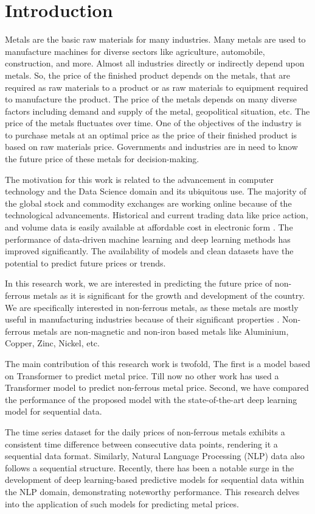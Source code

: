 \documentclass{ws-ijait}
\begin{document}
\section{Introduction}
Metals are the basic raw materials for many industries. Many metals are used to manufacture machines for diverse sectors like agriculture, automobile, construction, and more. Almost all industries directly or indirectly depend upon metals. So, the price of the finished product depends on the metals, that are required as raw materials to a product or as raw materials to equipment required to manufacture the product. The price of the metals depends on many diverse factors including demand and supply of the metal, geopolitical situation, etc. The price of the metals fluctuates over time. One of the objectives of the industry is to purchase metals at an optimal price as the price of their finished product is based on raw materials price. Governments and industries are in need to know the future price of these metals for decision-making.
\par The motivation for this work is related to the advancement in computer technology and the Data Science domain and its ubiquitous use. The majority of the global stock and commodity exchanges are working online because of the technological advancements. Historical and current trading data like price action, and volume data is easily available at affordable cost in electronic form \cite{chakole2023tutorial}. The performance of data-driven machine learning and deep learning methods has improved significantly. The availability of models and clean datasets have the potential to predict future prices or trends.
\par In this research work, we are interested in predicting the future price of non-ferrous metals as it is significant for the growth and development of the country. We are specifically interested in non-ferrous metals, as these metals are mostly useful in manufacturing industries because of their significant properties \cite{watkins2004econometric}. Non-ferrous metals are non-magnetic and non-iron based metals like Aluminium, Copper, Zinc, Nickel, etc.
\par The main contribution of this research work is twofold, The first is a model based on Transformer to predict metal price. Till now no other work has used a Transformer model to predict non-ferrous metal price. Second, we have compared the performance of the proposed model with the state-of-the-art deep learning model for sequential data.
\par The time series dataset for the daily prices of non-ferrous metals exhibits a consistent time difference between consecutive data points, rendering it a sequential data format. Similarly, Natural Language Processing (NLP) data also follows a sequential structure. Recently, there has been a notable surge in the development of deep learning-based predictive models for sequential data within the NLP domain, demonstrating noteworthy performance. This research delves into the application of such models for predicting metal prices.
\end{document}
